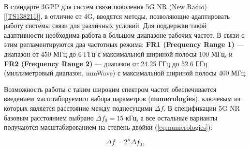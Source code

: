 %
%
%
  
В стандарте 3GPP для систем связи поколения 5G NR (New Radio) [\ref{TS138211}],
в отличие от 4G, вводятся методы, позволяющие адаптировать работу системы связи для различных условий.
Для поддержки такой адаптивности необходима работа в большом диапазоне рабочих частот. 
В связи с этим регламентируются два частотных режима: \textbf{FR1 (Frequency Range 1)} 
— диапазон от 450 МГц до 6 ГГц с максимальной шириной полосы 100 МГц, 
и \textbf{FR2 (Frequency Range 2)} — диапазон от 24.25 ГГц до 52.6 ГГц (миллиметровый диапазон, mmWave)
с максимальной шириной полосы 400 МГц.

Возможность работы с таким широким спектром частот обеспечивается введением масштабируемого набора параметров
(\textbf{numerologies}), ключевым из которых является расстояние между поднесущими $\Delta f$. 
В спецификации 5G NR базовым расстоянием выбрано $\Delta f_0 = 15$ кГц, 
а все остальные варианты получаются масштабированием на степень двойки (\ref{eq:numerologies}):

\begin{equation}
    \Delta f = 2^{\mu} \Delta f_0,
    \label{eq:numerologies}
\end{equation}

